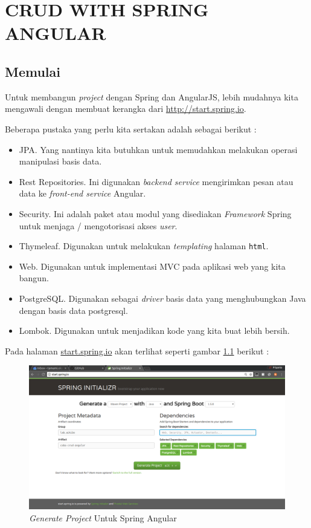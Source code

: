 \chapter{CRUD WITH SPRING ANGULAR}

\section{Memulai}

Untuk membangun \textit{project} dengan Spring dan AngularJS, lebih mudahnya kita mengawali dengan membuat kerangka dari \url{http://start.spring.io}. 

Beberapa pustaka yang perlu kita sertakan adalah sebagai berikut :

\begin{itemize}
	\item JPA. Yang nantinya kita butuhkan untuk memudahkan melakukan operasi manipulasi basis data.
	\item Rest Repositories. Ini digunakan \textit{backend service} mengirimkan pesan atau data ke \textit{front-end service} Angular.
	\item Security. Ini adalah paket atau modul yang disediakan \textit{Framework} Spring untuk menjaga / mengotorisasi akses \textit{user}.
	\item Thymeleaf. Digunakan untuk melakukan \textit{templating} halaman \texttt{html}.
	\item Web. Digunakan untuk implementasi MVC pada aplikasi web yang kita bangun.
	\item PostgreSQL. Digunakan sebagai \textit{driver} basis data yang menghubungkan Java dengan basis data postgresql.
	\item Lombok. Digunakan untuk menjadikan kode yang kita buat lebih bersih.
\end{itemize}

Pada halaman \url{start.spring.io} akan terlihat seperti gambar \ref{fig:generate-package-angular} berikut :

\begin{figure}[H]
	\centering
	\includegraphics[width=1\textwidth]{./resources/016-generate-package-angular}
	\caption{\textit{Generate Project} Untuk Spring Angular}
	\label{fig:generate-package-angular}
\end{figure}
	
